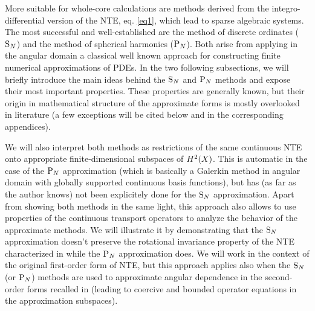 \vspace*{1em}
More suitable for whole-core calculations are methods derived from the integro-differential
version of the NTE, eq.
\eqref{eq1}, which lead to sparse algebraic systems. The most successful and well-established are the method
of discrete ordinates ($\SN$) and the method of spherical harmonics ($\PN$).
Both arise from applying in the
angular domain a classical well known approach for constructing finite numerical
approximations of PDEs.  In the two following
subsections, we will briefly introduce the main ideas behind the $\SN$ and $\PN$ methods and expose their most
important properties. These properties are generally known, but their origin in mathematical structure of the
approximate forms is mostly overlooked in literature (a few exceptions will be cited below and in the corresponding
appendices). 

We will also interpret both methods as restrictions of the same continuous NTE onto appropriate 
finite-dimensional subspaces of $\Hp[2](X)$. This is automatic in the case of the $\PN$ approximation (which is
basically a Galerkin method in angular domain with globally supported continuous basis functions), but has (as far as
the author knows) not been explicitely done for the $\SN$ approximation. Apart from showing both methods in the same light, this approach also allows to use properties
of the continuous transport operators to analyze the behavior of the approximate methods. We will illustrate it by demonstrating that the $\SN$ approximation doesn't 
preserve the rotational invariance property of the NTE characterized in  while the $\PN$ approximation 
does. We will work in the context of the original first-order form of NTE, but this approach applies also when the
$\SN$ (or $\PN$) methods are used to approximate angular dependence in the second-order forms recalled in
 (leading to coercive and bounded operator equations in the approximation subspaces). 
